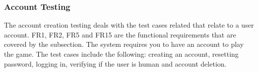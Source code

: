 \documentclass[12pt, titlepage]{article}
\begin{document}
\subsubsection{Account Testing}

The account creation testing deals with the test cases related that relate to a user account. FR1, FR2, FR5 and FR15 are the functional requirements that are covered by the subsection. The system requires you to have an account to play the game. The test cases include the following: creating an account, resetting password, logging in, verifying if the user is human and account deletion.


\end{document}
